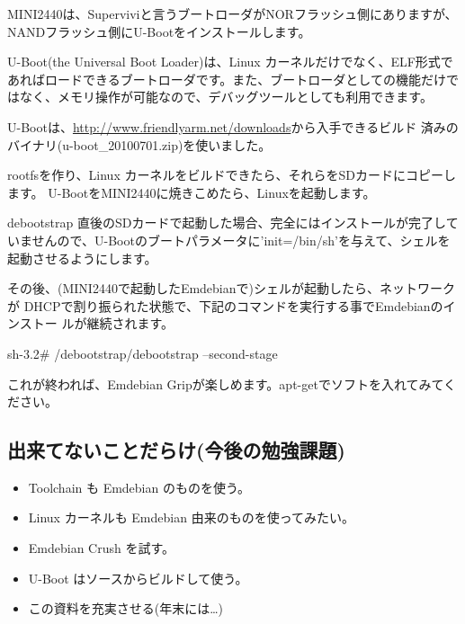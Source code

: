 \documentclass[mingoth,a4paper]{jsarticle}
\begin{document}

MINI2440は、Superviviと言うブートローダがNORフラッシュ側にありますが、
NANDフラッシュ側にU-Bootをインストールします。

U-Boot(the Universal Boot Loader)は、Linux カーネルだけでなく、ELF形式で
あればロードできるブートローダです。また、ブートローダとしての機能だけで
はなく、メモリ操作が可能なので、デバッグツールとしても利用できます。

U-Bootは、\url{http://www.friendlyarm.net/downloads}から入手できるビルド
済みのバイナリ(u-boot\_20100701.zip)を使いました。


rootfsを作り、Linux カーネルをビルドできたら、それらをSDカードにコピーし
ます。
U-BootをMINI2440に焼きこめたら、Linuxを起動します。

debootstrap 直後のSDカードで起動した場合、完全にはインストールが完了して
いませんので、U-Bootのブートパラメータに'init=/bin/sh'を与えて、シェルを
起動させるようにします。

その後、(MINI2440で起動したEmdebianで)シェルが起動したら、ネットワークが
DHCPで割り振られた状態で、下記のコマンドを実行する事でEmdebianのインストー
ルが継続されます。

\begin{commandline}
 sh-3.2# /debootstrap/debootstrap --second-stage
\end{commandline}

これが終われば、Emdebian Gripが楽しめます。apt-getでソフトを入れてみてく
ださい。

\subsection{出来てないことだらけ(今後の勉強課題)}
\begin{itemize}
 \item Toolchain も Emdebian のものを使う。
 \item Linux カーネルも Emdebian 由来のものを使ってみたい。
 \item Emdebian Crush を試す。
 \item U-Boot はソースからビルドして使う。
 \item この資料を充実させる(年末には…)
\end{itemize}

\end{document}
